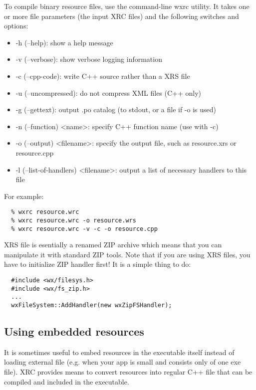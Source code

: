 To compile binary resource files, use the command-line wxrc utility. It takes one or more file parameters
(the input XRC files) and the following switches and options:
\begin{itemize}\itemsep=0pt
\item -h (--help): show a help message
\item -v (--verbose): show verbose logging information
\item -c (--cpp-code): write C++ source rather than a XRS file
\item -u (--uncompressed): do not compress XML files (C++ only)
\item -g (--gettext): output .po catalog (to stdout, or a file if -o is used)
\item -n (--function) <name>: specify C++ function name (use with -c)
\item -o (--output) <filename>: specify the output file, such as resource.xrs or resource.cpp
\item -l (--list-of-handlers) <filename>: output a list of necessary handlers to this file
\end{itemize}

For example:
\begin{verbatim}
  % wxrc resource.wrc
  % wxrc resource.wrc -o resource.wrs
  % wxrc resource.wrc -v -c -o resource.cpp
\end{verbatim}


XRS file is esentially a renamed ZIP archive which means that you can manipulate
it with standard ZIP tools. Note that if you are using XRS files, you have
to initialize  ZIP handler first! It is a simple
thing to do:
\begin{verbatim}
  #include <wx/filesys.h>
  #include <wx/fs_zip.h>
  ...
  wxFileSystem::AddHandler(new wxZipFSHandler);
\end{verbatim}

\subsection{Using embedded resources}\label{embeddedresource}

It is sometimes useful to embed resources in the executable itself instead
of loading external file (e.g. when your app is small and consists only of one
exe file). XRC provides means to convert resources into regular C++ file that
can be compiled and included in the executable. 


